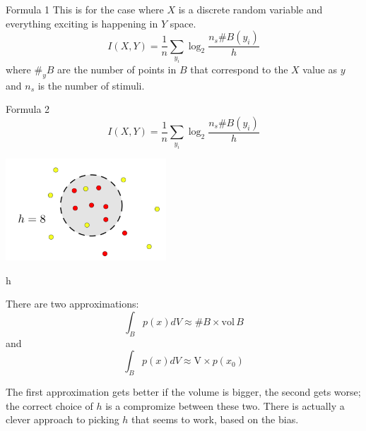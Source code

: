 \documentclass{beamer}
\begin{document}
\begin{frame}{Formula 1}
This is for the case where $X$ is a discrete random variable and
everything exciting is happening in $Y$ space.
\color{dark}
$$I(X,Y)=\frac{1}{n}\sum_{y_i}\log_2{\frac{n_s\#B(y_i)}{h}}$$
\color{black}
where
$\#_{y}B$ are the number of points in $B$ that correspond to the $X$
value as $y$ and $n_s$ is the number of stimuli.
\end{frame}


\begin{frame}{Formula 2}
\color{dark}
$$I(X,Y)=\frac{1}{n}\sum_{y_i}\log_2{\frac{n_s \#B(y_i)}{h}}$$
\color{black}
\begin{center}
\includegraphics[width=6cm]{dots.png}
\end{center}
\end{frame}


\begin{frame}{h}

There are two approximations:
$$\int_B p(x)dV \approx \# B\times \mbox{vol}\,B$$
and
$$\int_B p(x)dV \approx \mbox{V}\times p(x_0)$$ 

The first approximation gets better if the volume is bigger, the
second gets worse; the correct choice of $h$ is a compromize between
these two. There is actually a clever approach to picking $h$ that
seems to work, based on the bias.
\end{frame}
\end{document}

